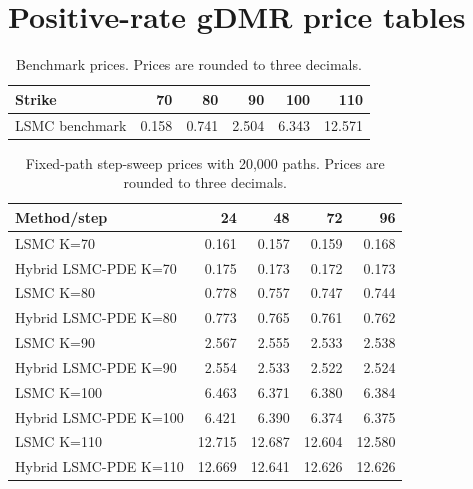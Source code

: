 \section*{Positive-rate gDMR price tables}
\begin{table}[htbp]\centering
\caption{Benchmark prices. Prices are rounded to three decimals.}
\begin{tabular}{lrrrrr}
\toprule
Strike & 70 & 80 & 90 & 100 & 110 \\
\midrule
LSMC benchmark & 0.158 & 0.741 & 2.504 & 6.343 & 12.571 \\
\bottomrule
\end{tabular}
\end{table}

\begin{table}[htbp]\centering
\caption{Fixed-path step-sweep prices with 20,000 paths. Prices are rounded to three decimals.}
\begin{tabular}{lrrrr}
\toprule
Method/step & 24 & 48 & 72 & 96 \\
\midrule
LSMC K=70 & 0.161 & 0.157 & 0.159 & 0.168 \\
Hybrid LSMC-PDE K=70 & 0.175 & 0.173 & 0.172 & 0.173 \\
LSMC K=80 & 0.778 & 0.757 & 0.747 & 0.744 \\
Hybrid LSMC-PDE K=80 & 0.773 & 0.765 & 0.761 & 0.762 \\
LSMC K=90 & 2.567 & 2.555 & 2.533 & 2.538 \\
Hybrid LSMC-PDE K=90 & 2.554 & 2.533 & 2.522 & 2.524 \\
LSMC K=100 & 6.463 & 6.371 & 6.380 & 6.384 \\
Hybrid LSMC-PDE K=100 & 6.421 & 6.390 & 6.374 & 6.375 \\
LSMC K=110 & 12.715 & 12.687 & 12.604 & 12.580 \\
Hybrid LSMC-PDE K=110 & 12.669 & 12.641 & 12.626 & 12.626 \\
\bottomrule
\end{tabular}
\end{table}


